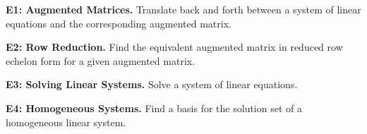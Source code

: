 

\begin{moduleStandards}
  \item \textbf{E1: Augmented Matrices.}
        Translate back and forth between a system of linear equations and
        the corresponding augmented matrix.
  \item \textbf{E2: Row Reduction.}
        Find the equivalent augmented matrix in reduced row echelon form
        for a given augmented matrix.
  \item \textbf{E3: Solving Linear Systems.}
        Solve a system of linear equations.
  \item \textbf{E4: Homogeneous Systems.}
        Find a basis for the solution set of a homogeneous linear system.
\end{moduleStandards}



